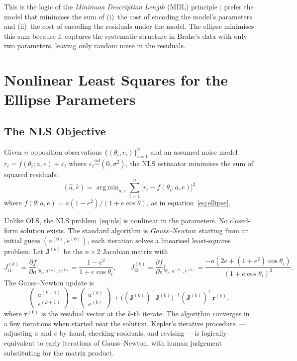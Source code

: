 \documentclass[12pt]{article}
\DeclareMathOperator*{\argmin}{arg\,min}
\begin{document}
This is the logic of the \emph{Minimum Description Length} (MDL) principle
\citep{Udrescu2020,SchmidtLipson2009}: prefer the model that minimises the
sum of (i)~the cost of encoding the model's parameters and (ii)~the cost of
encoding the residuals under the model.
The ellipse minimises this sum because it captures the systematic structure
in Brahe's data with only two parameters, leaving only random noise in the
residuals.

\section{Nonlinear Least Squares for the Ellipse Parameters}
\label{sec:nls}

\subsection{The NLS Objective}

Given $n$ opposition observations $\{(\theta_{i},r_{i})\}_{i=1}^{n}$ and
an assumed noise model $r_{i}=f(\theta_{i};a,e)+\varepsilon_{i}$ where
$\varepsilon_{i}\overset{iid}{\sim}(0,\sigma^{2})$, the NLS estimator
minimises the sum of squared residuals:
\begin{equation}\label{eq:nls}
  (\hat{a},\hat{e}) = \argmin_{a,e}
    \sum_{i=1}^{n}\bigl[r_{i} - f(\theta_{i};a,e)\bigr]^{2}
\end{equation}
where $f(\theta;a,e)=a(1-e^{2})/(1+e\cos\theta)$, as in
equation~\eqref{eq:ellipse}.

Unlike OLS, the NLS problem~\eqref{eq:nls} is nonlinear in the parameters.
No closed-form solution exists.
The standard algorithm is \emph{Gauss--Newton}: starting from an initial
guess $(a^{(0)},e^{(0)})$, each iteration solves a linearised least-squares
problem.
Let $\mathbf{J}^{(k)}$ be the $n\times2$ Jacobian matrix with
\[
  J_{i1}^{(k)} = \frac{\partial f}{\partial a}\Big|_{\theta_{i},\,a^{(k)},e^{(k)}}
               = \frac{1-e^{2}}{1+e\cos\theta_{i}},
  \qquad
  J_{i2}^{(k)} = \frac{\partial f}{\partial e}\Big|_{\theta_{i},\,a^{(k)},e^{(k)}}
               = \frac{-a(2e+(1+e^{2})\cos\theta_{i})}{(1+e\cos\theta_{i})^{2}}.
\]
The Gauss--Newton update is
\begin{equation}\label{eq:gaussnewton}
  \begin{pmatrix}a^{(k+1)}\\e^{(k+1)}\end{pmatrix}
  = \begin{pmatrix}a^{(k)}\\e^{(k)}\end{pmatrix}
  + \bigl((\mathbf{J}^{(k)})^{\top}\mathbf{J}^{(k)}\bigr)^{-1}
    (\mathbf{J}^{(k)})^{\top}\mathbf{r}^{(k)},
\end{equation}
where $\mathbf{r}^{(k)}$ is the residual vector at the $k$-th iterate.
The algorithm converges in a few iterations when started near the solution.
Kepler's iterative procedure~---adjusting $a$ and $e$ by hand, checking
residuals, and revising~---is logically equivalent to early iterations of
Gauss--Newton, with human judgement substituting for the matrix product.
\end{document}
